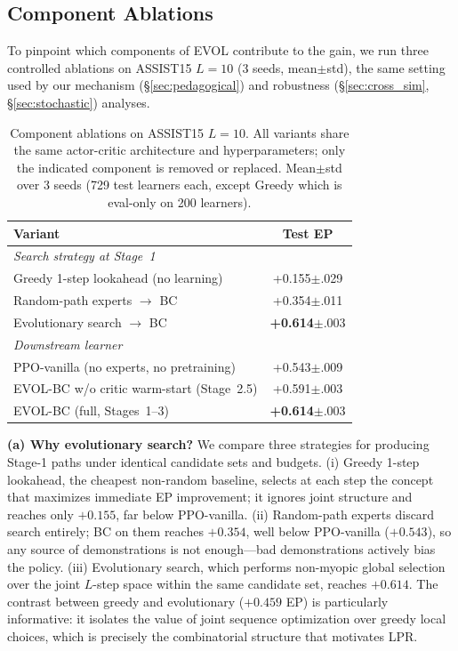 \documentclass[sigconf,anonymous]{acmart}
\newcommand{\ours}{\textrm{EVOL}}
\begin{document}
\subsection{Component Ablations}
\label{sec:ablation_random}

To pinpoint which components of \ours{} contribute to the gain, we run three controlled ablations on ASSIST15 $L\!=\!10$ (3 seeds, mean$\pm$std), the same setting used by our mechanism (\S\ref{sec:pedagogical}) and robustness (\S\ref{sec:cross_sim}, \S\ref{sec:stochastic}) analyses.

\begin{table}[t]
\centering
\caption{Component ablations on ASSIST15 $L{=}10$. All variants share the same actor-critic architecture and hyperparameters; only the indicated component is removed or replaced. Mean$\pm$std over 3 seeds (729 test learners each, except Greedy which is eval-only on 200 learners).}
\label{tab:ablation_components}
\begin{tabular}{@{}lc@{}}
\toprule
Variant & Test EP \\
\midrule
\emph{Search strategy at Stage~1} \\
\quad Greedy 1-step lookahead (no learning) & +0.155{\scriptsize$\pm$.029} \\
\quad Random-path experts $\to$ BC                  & +0.354{\scriptsize$\pm$.011} \\
\quad Evolutionary search $\to$ BC                  & \textbf{+0.614}{\scriptsize$\pm$.003} \\
\midrule
\emph{Downstream learner} \\
\quad PPO-vanilla (no experts, no pretraining)      & +0.543{\scriptsize$\pm$.009} \\
\quad \ours{}-BC w/o critic warm-start (Stage~2.5)  & +0.591{\scriptsize$\pm$.003} \\
\quad \ours{}-BC (full, Stages~1--3)                & \textbf{+0.614}{\scriptsize$\pm$.003} \\
\bottomrule
\end{tabular}
\end{table}

\textbf{(a) Why evolutionary search?}
We compare three strategies for producing Stage-1 paths under identical candidate sets and budgets. (i) Greedy 1-step lookahead, the cheapest non-random baseline, selects at each step the concept that maximizes immediate EP improvement; it ignores joint structure and reaches only $+0.155$, far below PPO-vanilla. (ii) Random-path experts discard search entirely; BC on them reaches $+0.354$, well below PPO-vanilla ($+0.543$), so any source of demonstrations is not enough---bad demonstrations actively bias the policy. (iii) Evolutionary search, which performs non-myopic global selection over the joint $L$-step space within the same candidate set, reaches $+0.614$. The contrast between greedy and evolutionary ($+0.459$ EP) is particularly informative: it isolates the value of joint sequence optimization over greedy local choices, which is precisely the combinatorial structure that motivates LPR.
\end{document}

